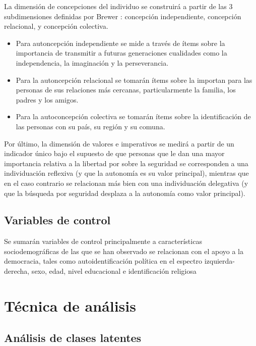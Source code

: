 \documentclass[12pt,twoside]{templates/facsothesis}
\providecommand{\tightlist}{%
  \setlength{\itemsep}{0pt}\setlength{\parskip}{0pt}}
\begin{document}
La dimensión de concepciones del individuo se construirá a partir de las 3 subdimensiones definidas por Brewer \citeyearpar{brewer2007}: concepción independiente, concepción relacional, y concepción colectiva.

\begin{itemize}
\tightlist
\item
  Para autoncepción independiente se mide a través de ítems sobre la importancia de transmitir a futuras generaciones cualidades como la independencia, la imaginación y la perseverancia.
\item
  Para la autoncepción relacional se tomarán ítems sobre la importan para las personas de sus relaciones más cercanas, particularmente la familia, los padres y los amigos.
\item
  Para la autoconcepción colectiva se tomarán ítems sobre la identificación de las personas con su país, su región y su comuna.
\end{itemize}

Por último, la dimensión de valores e imperativos se medirá a partir de un indicador único bajo el supuesto de que personas que le dan una mayor importancia relativa a la libertad por sobre la seguridad se corresponden a una individuación reflexiva (y que la autonomía es su valor principal), mientras que en el caso contrario se relacionan más bien con una individuación delegativa (y que la búsqueda por seguridad desplaza a la autonomía como valor principal).

\hypertarget{variables-de-control}{%
\subsection{Variables de control}\label{variables-de-control}}

Se sumarán variables de control principalmente a características sociodemográficas de las que se han observado se relacionan con el apoyo a la democracia, tales como autoidentificación política en el espectro izquierda-derecha, sexo, edad, nivel educacional e identificación religiosa \citep{navia2019, gidron2020, eskelinen2020}

\hypertarget{tuxe9cnica-de-anuxe1lisis}{%
\section{Técnica de análisis}\label{tuxe9cnica-de-anuxe1lisis}}

\hypertarget{anuxe1lisis-de-clases-latentes}{%
\subsection{Análisis de clases latentes}\label{anuxe1lisis-de-clases-latentes}}
\end{document}
